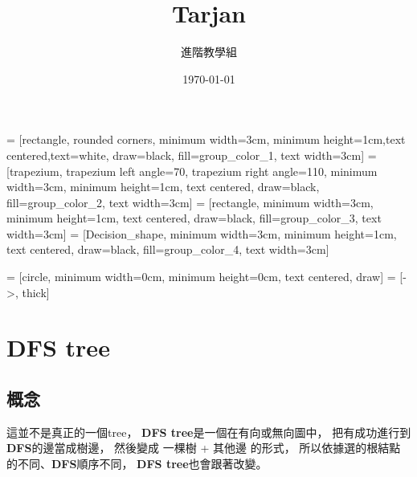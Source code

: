 \documentclass[12pt,oneside]{article}
\title{ Tarjan }
\author{ 進階教學組 }
\date{ \today }
\begin{document}







 = [rectangle, rounded corners, minimum width=3cm, minimum height=1cm,text centered,text=white, draw=black, fill=group_color_1, text width=3cm]
 = [trapezium, trapezium left angle=70, trapezium right angle=110, minimum width=3cm, minimum height=1cm, text centered, draw=black, fill=group_color_2, text width=3cm]
 = [rectangle, minimum width=3cm, minimum height=1cm, text centered, draw=black, fill=group_color_3, text width=3cm]
 = [Decision_shape, minimum width=3cm, minimum height=1cm, text centered, draw=black, fill=group_color_4, text width=3cm]

 = [circle, minimum width=0cm, minimum height=0cm, text centered, draw]
 = [->, thick]






\pagestyle{empty}
\maketitle

\thispagestyle{empty}

\clearpage

\tableofcontents
\pagestyle{plain}
\setcounter{page}{0}
\clearpage

\section{DFS tree}
\subsection{概念}
{\color{red}這並不是真正的一個tree}，
\textbf{DFS tree}是一個在有向或無向圖中，
把有成功進行到\textbf{DFS}的邊當成樹邊，
然後變成 一棵樹 + 其他邊 的形式，
所以依據選的根結點的不同、\textbf{DFS}順序不同，
\textbf{DFS tree}也會跟著改變。
\end{document}
